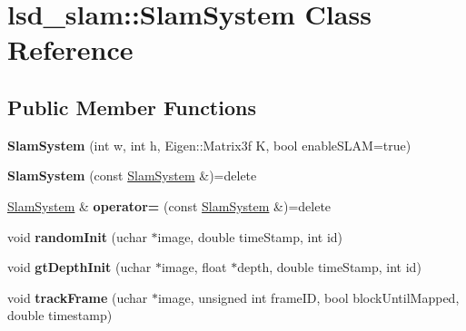 \hypertarget{classlsd__slam_1_1_slam_system}{\section{lsd\-\_\-slam\-:\-:Slam\-System Class Reference}
\label{classlsd__slam_1_1_slam_system}
}
\subsection*{Public Member Functions}
\begin{DoxyCompactItemize}
\item 
\hypertarget{classlsd__slam_1_1_slam_system_a35a27a8430a71a0852f1cce9a80ba48e}{{\bfseries Slam\-System} (int w, int h, Eigen\-::\-Matrix3f K, bool enable\-S\-L\-A\-M=true)}\label{classlsd__slam_1_1_slam_system_a35a27a8430a71a0852f1cce9a80ba48e}

\item 
\hypertarget{classlsd__slam_1_1_slam_system_a52c04711d79a56fb7fed67857bd8645a}{{\bfseries Slam\-System} (const \hyperlink{classlsd__slam_1_1_slam_system}{Slam\-System} \&)=delete}\label{classlsd__slam_1_1_slam_system_a52c04711d79a56fb7fed67857bd8645a}

\item 
\hypertarget{classlsd__slam_1_1_slam_system_ab33477ee62c1ec8ea70f431f01a04333}{\hyperlink{classlsd__slam_1_1_slam_system}{Slam\-System} \& {\bfseries operator=} (const \hyperlink{classlsd__slam_1_1_slam_system}{Slam\-System} \&)=delete}\label{classlsd__slam_1_1_slam_system_ab33477ee62c1ec8ea70f431f01a04333}

\item 
\hypertarget{classlsd__slam_1_1_slam_system_a04efedcb7753da51a13c5362b2f47f27}{void {\bfseries random\-Init} (uchar $\ast$image, double time\-Stamp, int id)}\label{classlsd__slam_1_1_slam_system_a04efedcb7753da51a13c5362b2f47f27}

\item 
\hypertarget{classlsd__slam_1_1_slam_system_ae02d68a3e3a62b6000aa6e30fbc68cdc}{void {\bfseries gt\-Depth\-Init} (uchar $\ast$image, float $\ast$depth, double time\-Stamp, int id)}\label{classlsd__slam_1_1_slam_system_ae02d68a3e3a62b6000aa6e30fbc68cdc}

\item 
\hypertarget{classlsd__slam_1_1_slam_system_a5cf500a63c1b36530e03af22494393ad}{void {\bfseries track\-Frame} (uchar $\ast$image, unsigned int frame\-I\-D, bool block\-Until\-Mapped, double timestamp)}\label{classlsd__slam_1_1_slam_system_a5cf500a63c1b36530e03af22494393ad}


\end{DoxyCompactItemize}
